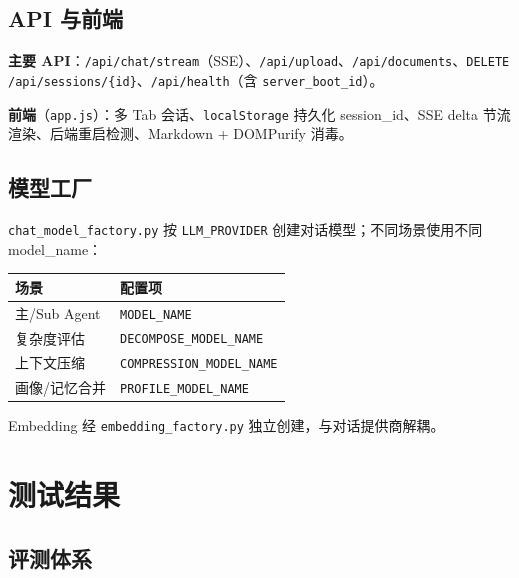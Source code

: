 \documentclass[11pt,a4paper]{ctexart}
\begin{document}
\subsection{API 与前端}

\textbf{主要 API}：\texttt{/api/chat/stream}（SSE）、\texttt{/api/upload}、\texttt{/api/documents}、\texttt{DELETE /api/sessions/\{id\}}、\texttt{/api/health}（含 \texttt{server\_boot\_id}）。

\textbf{前端}（\texttt{app.js}）：多 Tab 会话、\texttt{localStorage} 持久化 session\_id、SSE delta 节流渲染、后端重启检测、Markdown + DOMPurify 消毒。

\subsection{模型工厂}

\texttt{chat\_model\_factory.py} 按 \texttt{LLM\_PROVIDER} 创建对话模型；不同场景使用不同 model\_name：

\begin{center}
\begin{tabular}{ll}
\toprule
\textbf{场景} & \textbf{配置项} \\
\midrule
主/Sub Agent & \texttt{MODEL\_NAME} \\
复杂度评估 & \texttt{DECOMPOSE\_MODEL\_NAME} \\
上下文压缩 & \texttt{COMPRESSION\_MODEL\_NAME} \\
画像/记忆合并 & \texttt{PROFILE\_MODEL\_NAME} \\
\bottomrule
\end{tabular}
\end{center}

Embedding 经 \texttt{embedding\_factory.py} 独立创建，与对话提供商解耦。

\section{测试结果}

\subsection{评测体系}
\end{document}
